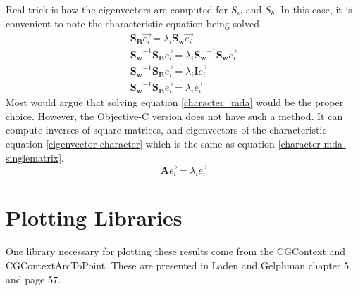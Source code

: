 \documentclass[11pt]{article}
\begin{document}
Real trick is how the eigenvectors are computed for $S_w$ and $S_b$. In this case, it is convenient to note the characteristic equation being solved.
\begin{eqnarray}
\mathbf{S_B}\vec{e_i} = \lambda_i \mathbf{S_w}\vec{e_i} \label{character_mda}\\
\mathbf{S_w}^{-1}\mathbf{S_B}\vec{e_i} = \lambda_i \mathbf{S_w}^{-1} \mathbf{S_w}\vec{e_i} \\
\mathbf{S_w}^{-1}\mathbf{S_B}\vec{e_i} = \lambda_i \mathbf{I} \vec{e_i} \\
\mathbf{S_w}^{-1}\mathbf{S_B}\vec{e_i} = \lambda_i \vec{e_i} \label{character-mda-singlematrix}
\end{eqnarray}
Most would argue that solving equation \ref{character_mda} would be the proper choice.  However, the Objective-C version does not have such a method.  It can compute inverses of square matrices, and eigenvectors of the characteristic equation \ref{eigenvector-character} which is the same as equation \ref{character-mda-singlematrix}.
\begin{equation}
\mathbf{A} \vec{e_i} = \lambda_i \vec{e_i} \label{eigenvector-character}
\end{equation}


\section {Plotting Libraries}
One library necessary for plotting these results come from the CGContext and CGContextArcToPoint.  These are presented in Laden and Gelphman chapter 5 and page 57.  
\end{document}
